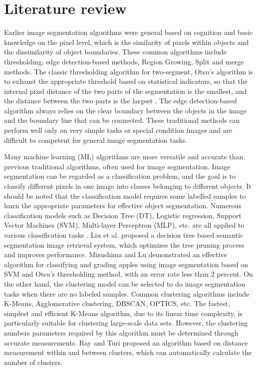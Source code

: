 \documentclass[12pt, a4paper]{article}
\begin{document}
	\section{Literature review} \justify
	Earlier image segmentation algorithms were general based on cognition and basic knowledge on the pixel level, which is the similarity of pixels within objects and the dissimilarity of object boundaries. These common algorithms include thresholding, edge detection-based methods, Region Growing, Split and merge methods. The classic thresholding algorithm for two-segment, Otsu's algorithm is to exhaust the appropriate threshold based on statistical indicators, so that the internal pixel distance of the two parts of the segmentation is the smallest, and the distance between the two parts is the largest \cite{otsu1979threshold}. The edge detection-based algorithm always relies on the clear boundary between the objects in the image and the boundary line that can be connected. These traditional methods can perform well only on very simple tasks or special condition images and are difficult to competent for general image segmentation tasks.
	\par 	
	Many machine learning (ML) algorithms are more versatile and accurate than previous traditional algorithms, often used for image segmentation. Image segmentation can be regarded as a classification problem, and the goal is to classify different pixels in one image into classes belonging to different objects. It should be noted that the classification model requires some labelled samples to learn the appropriate parameters for effective object segmentation. Numerous classification models such as Decision Tree (DT), Logistic regression, Support Vector Machines (SVM), Multi-layer Perceptron (MLP), etc. are all applied to various classification tasks \cite{pedregosa2011scikit}. Liu et al. \cite{liu2006region} proposed a decision tree based semantic segmentation image retrieval system, which optimizes the tree pruning process and improves performance. Mizushima and Lu \cite{mizushima2013image} demonstrated an effective algorithm for classifying and grading apples using image segmentation based on SVM and Otsu’s thresholding method, with an error rate less than 2 percent. On the other hand, the clustering model can be selected to do image segmentation tasks when there are no labeled samples. Common clustering algorithms include K-Means, Agglomerative clustering, DBSCAN, OPTICS, etc. The fastest, simplest and efficient K-Means algorithm, due to its linear time complexity, is particularly suitable for clustering large-scale data sets. However, the clustering numbers parameters required by this algorithm must be determined through accurate measurements. Ray and Turi \cite{ray1999determination} proposed an algorithm based on distance measurement within and between clusters, which can automatically calculate the number of clusters.
\end{document}
